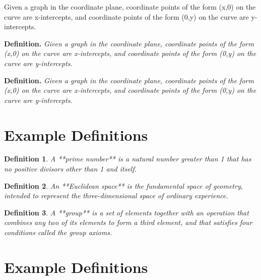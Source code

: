 \documentclass{article}
\newtheorem{definition}{Definition}
\begin{document}
\begin{theo}
Given a graph in the coordinate plane, 
coordinate points of the form (x,0) on the curve are x-intercepts,
 and coordinate points of the form (0,y) on the curve are y-intercepts.
\end{theo}

\begin{tcolorbox}[
    width=\linewidth,
    colframe=black,         %
    colback=white,          %
    boxrule=0.5pt,          %
    left=1mm, right=1mm,    %
    top=1mm, bottom=1mm,    %
    arc=2mm                 %
]
\textbf{Definition.} \textit{Given a graph in the coordinate plane, coordinate points of the form (x,0) on the curve are x-intercepts, and coordinate points of the form (0,y) on the curve are y-intercepts.}
\end{tcolorbox}

\begin{tcolorbox}
\textbf{Definition.} \textit{Given a graph in the coordinate plane, coordinate points of the form (x,0) on the curve are x-intercepts, and coordinate points of the form (0,y) on the curve are y-intercepts.}
\end{tcolorbox}

\section*{Example Definitions}

\begin{definition}
  A **prime number** is a natural number greater than 1 that has no positive divisors other than 1 and itself.
\end{definition}

\begin{definition}
  An **Euclidean space** is the fundamental space of geometry, intended to represent the three-dimensional space of ordinary experience.
\end{definition}

\begin{definition}
  A **group** is a set of elements together with an operation that combines any two of its elements to form a third element, and that satisfies four conditions called the group axioms.
\end{definition}

\section*{Example Definitions}
\end{document}
